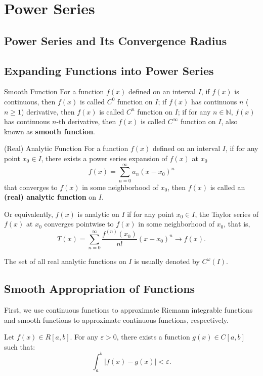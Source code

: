\chapter{Power Series} %
\section{Power Series and Its Convergence Radius} %

\section{Expanding Functions into Power Series} %
\begin{definition}{Smooth Function}\label{def:smooth_function}
    For a function \( f(x) \) defined on an interval \( I \), 
    if \( f(x) \) is continuous, then \(f(x)\) is called \(C^{0}\) function on \( I \);
    if \( f(x) \) has continuous \(n\) (\(n \geq 1\)) derivative, then \(f(x)\) is called \(C^{n}\) function on \( I \);
    if for any \(n \in \mathbb{N}\), \(f(x)\) has continuous \(n\)-th derivative, 
    then \(f(x)\) is called \(C^{\infty}\) function on \( I \), also known as \textbf{smooth function}.
\end{definition}

\begin{definition}{(Real) Analytic Function}\label{def:real_analytic_function}
    For a function \( f(x) \) defined on an interval \( I \), 
    if for any point \( x_{0} \in I \), there exists a power series expansion of \(f(x)\) at \(x_{0}\) 
    \[
    f(x) = \sum_{n=0}^{\infty} a_{n} (x - x_{0})^{n}
    \]
    that converges to \(f(x)\) in some neighborhood of \(x_{0}\), 
    then \(f(x)\) is called an \textbf{(real) analytic function} on \( I \).
    
    Or equivalently, \(f(x)\) is analytic on \(I\) if for any point \(x_{0} \in I\),
    the Taylor series of \(f(x)\) at \(x_{0}\) converges pointwise to \(f(x)\) in some neighborhood of \(x_{0}\), that is,
    \[
    T(x) = \sum_{n=0}^{\infty} \frac{f^{(n)}(x_{0})}{n!} (x - x_{0})^{n} \to  f(x).
    \]

    The set of all real analytic functions on \(I\) is usually denoted by \(C^{\omega}(I)\).
\end{definition}


\section{Smooth Appropriation of Functions}
First, we use continuous functions to approximate Riemann integrable functions
and smooth functions to approximate continuous functions, respectively.
\begin{theorem}
    Let \( f(x) \in R[a, b] \). For any \( \varepsilon > 0 \), 
    there exists a function \( g(x) \in C[a, b] \) such that:
    \[
    \int_{a}^{b}|f(x) - g(x)| < \varepsilon.
    \]
\end{theorem}


